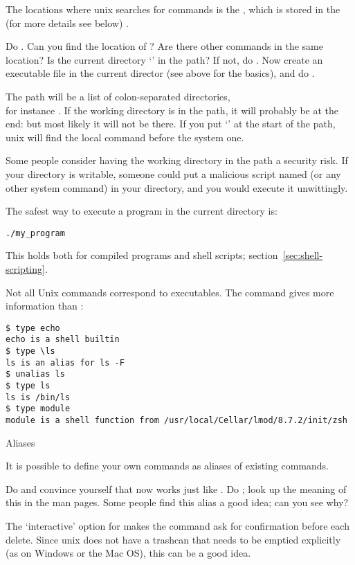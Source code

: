 The locations where unix searches for commands is the
,
which is stored in the  (for more
details see below) .

\begin{exercise}
  Do . Can you find the location of ?  Are there
  other commands in the same location? Is the current directory
  `' in the path? If not, do . Now
  create an executable file  in the current director (see above
  for the basics), and do .
\end{exercise}
\begin{outcome}
  The path will be a list of colon-separated directories,\\ for
  instance . If the working
  directory is in the path, it will probably be at the end:
    but most likely it will not be there. If you
  put `' at the start of the path, unix will find the local
   command before the system one.
\end{outcome}

Some people consider having the working directory in the path a
security risk. If your directory is writable, someone could put a
malicious script named  (or any other system command) in your
directory, and you would execute it unwittingly.

The safest way to execute a program in the current directory is:
\begin{lstlisting}
./my_program
\end{lstlisting}
This holds both for compiled programs and shell scripts;
section~\ref{sec:shell-scripting}.

\begin{remark}
  Not all Unix commands correspond to executables. The
   command gives more information than :
\begin{lstlisting}
$ type echo
echo is a shell builtin
$ type \ls
ls is an alias for ls -F
$ unalias ls
$ type ls
ls is /bin/ls
$ type module
module is a shell function from /usr/local/Cellar/lmod/8.7.2/init/zsh
\end{lstlisting}
\end{remark}

 {Aliases}

It is possible to define your own commands as aliases of existing
commands.

\begin{exercise}
  Do  and convince yourself that now  works
  just like . Do ; look up the meaning of
  this in the man pages. Some people find this alias a good idea; can
  you see why?
\end{exercise}
\begin{outcome}
  The  `interactive' option for  makes the command ask for
  confirmation before each delete. Since unix does not have a trashcan
  that needs to be emptied explicitly (as on Windows or the Mac OS),
  this can be a good idea.
\end{outcome}

